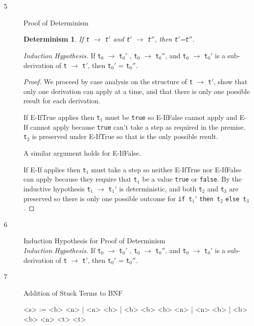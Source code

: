 \documentclass{article}
\newtheorem{deter}{Determinism}
\begin{document}
\begin{description}
  \item[5]{Proof of Determinism}
    \begin{deter}If \verb|t| $\longrightarrow$ \verb|t|$'$ and \verb|t|$'$ $\longrightarrow$ \verb|t|$''$, then \verb|t|$'$=\verb|t|$''$.
    \end{deter}

    \textit{Induction Hypothesis.} If \verb|t|$_0$ $\longrightarrow$ \verb|t|$_0'$ , \verb|t|$_0$ $\longrightarrow$ \verb|t|$_0''$, and \verb|t|$_0$ $\longrightarrow$ \verb|t|$_0'$ is a sub-derivation of \verb|t| $\longrightarrow$ \verb|t|$'$, then \verb|t|$_0'$ = \verb|t|$_0''$.

    \begin{proof}
      We proceed by case analysis on the structure of \verb|t| $\longrightarrow$ \verb|t|$'$, show that only one derivation can apply at a time, and that there is only one possible result for each derivation.

      If E-IfTrue applies then \verb|t|$_1$ must be \verb|true| so E-IfFalse cannot apply and E-If cannot apply because \verb|true| can't take a step as required in the premise. \verb|t|$_2$ is preserved under E-IfTrue so that is the only possible result.

      A similar argument holds for E-IfFalse.

      If E-If applies then \verb|t|$_1$ must take a step so neither E-IfTrue nor E-IfFalse can apply because they require that \verb|t|$_1$ be a value \verb|true| or \verb|false|. By the inductive hypothesis \verb|t|$_1$ $\longrightarrow$ \verb|t|$_1'$ is deterministic, and both \verb|t|$_2$ and \verb|t|$_3$ are preserved so there is only one possible outcome for \verb|if t|$_1'$ \verb|then t|$_2$ \verb|else t|$_3$.
    \end{proof}

  \item[6]{Induction Hypothesis for Proof of Determinism}
    \vspace{0.3cm}\\
    \textit{Induction Hypothesis.} If \verb|t|$_0$ $\longrightarrow$ \verb|t|$_0'$ , \verb|t|$_0$ $\longrightarrow$ \verb|t|$_0''$, and \verb|t|$_0$ $\longrightarrow$ \verb|t|$_0'$ is a sub-derivation of \verb|t| $\longrightarrow$ \verb|t|$'$, then \verb|t|$_0'$ = \verb|t|$_0''$.

  \item[7]{Addition of Stuck Terms to BNF}

    \begin{grammar}
      <s> :=  <b>  \lit*{+} <n> | <n> \lit*{+} <b> | <b> \lit*{+} <b>
      \alt <b>  \lit*{>} <n> | <n> \lit*{>} <b> | <b> \lit*{>} <b>
      \alt {} <n>  <t>  <t>


\end{grammar}
\end{description}
\end{document}
